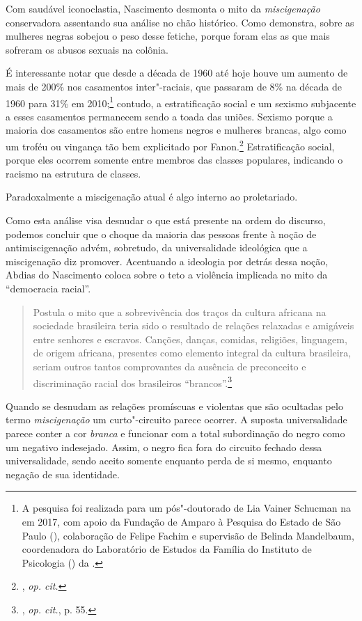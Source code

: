 Com saudável iconoclastia, Nascimento desmonta o mito da
\emph{miscigenação} conservadora assentando sua análise no chão
histórico. Como demonstra, sobre as mulheres negras sobejou o peso desse
fetiche, porque foram elas as que mais sofreram os abusos sexuais na
colônia.

É interessante notar que desde a década de 1960 até hoje houve um
aumento de mais de 200\% nos casamentos inter"-raciais, que passaram de
8\% na década de 1960 para 31\% em 2010;\footnote{A pesquisa foi
  realizada para um pós"-doutorado de Lia Vainer Schucman na  em 2017,
  com apoio da Fundação de Amparo à Pesquisa do Estado de São Paulo
  (), colaboração de Felipe Fachim e supervisão de Belinda
  Mandelbaum, coordenadora do Laboratório de Estudos da Família do
  Instituto de Psicologia () da .} contudo, a estratificação
social e um sexismo subjacente a esses casamentos permanecem sendo a
toada das uniões. Sexismo porque a maioria dos casamentos são entre
homens negros e mulheres brancas, algo como um troféu ou vingança tão
bem explicitado por Fanon.\footnote{, \emph{op. cit.}} Estratificação
social, porque eles ocorrem somente entre membros das classes populares,
indicando o racismo na estrutura de classes.

Paradoxalmente a miscigenação atual é algo interno ao proletariado.

Como esta análise visa desnudar o que está presente na ordem do
discurso, podemos concluir que o choque da maioria das pessoas frente à
noção de antimiscigenação advém, sobretudo, da universalidade ideológica
que a miscigenação diz promover. Acentuando a ideologia por detrás dessa
noção, Abdias do Nascimento coloca sobre o teto a violência implicada no
mito da ``democracia racial''.

\begin{quote}
Postula o mito que a sobrevivência dos traços da cultura africana na
sociedade brasileira teria sido o resultado de relações relaxadas e
amigáveis entre senhores e escravos. Canções, danças, comidas,
religiões, linguagem, de origem africana, presentes como elemento
integral da cultura brasileira, seriam outros tantos comprovantes da
ausência de preconceito e discriminação racial dos brasileiros
``brancos''.\footnote{, \emph{op. cit.}, p. 55.}
\end{quote}

Quando se desnudam as relações promíscuas e violentas que são ocultadas
pelo termo \emph{miscigenação} um curto"-circuito parece ocorrer. A
suposta universalidade parece conter a cor \emph{branca} e funcionar com
a total subordinação do negro como um negativo indesejado. Assim, o
negro fica fora do circuito fechado dessa universalidade, sendo aceito
somente enquanto perda de si mesmo, enquanto negação de sua identidade.

